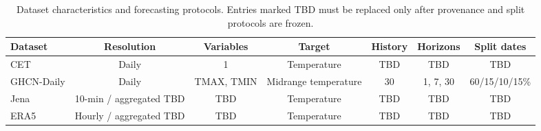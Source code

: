 \begin{table}[t]
\centering
\caption{Dataset characteristics and forecasting protocols. Entries marked TBD must be replaced only after provenance and split protocols are frozen.}
\label{tab:datasets}
\begin{tabular}{lcccccc}
\hline
Dataset & Resolution & Variables & Target & History & Horizons & Split dates \\
\hline
CET & Daily & 1 & Temperature & TBD & TBD & TBD \\
GHCN-Daily & Daily & TMAX, TMIN & Midrange temperature & 30 & 1, 7, 30 & 60/15/10/15\% \\
Jena & 10-min / aggregated TBD & TBD & Temperature & TBD & TBD & TBD \\
ERA5 & Hourly / aggregated TBD & TBD & Temperature & TBD & TBD & TBD \\
\hline
\end{tabular}
\end{table}
